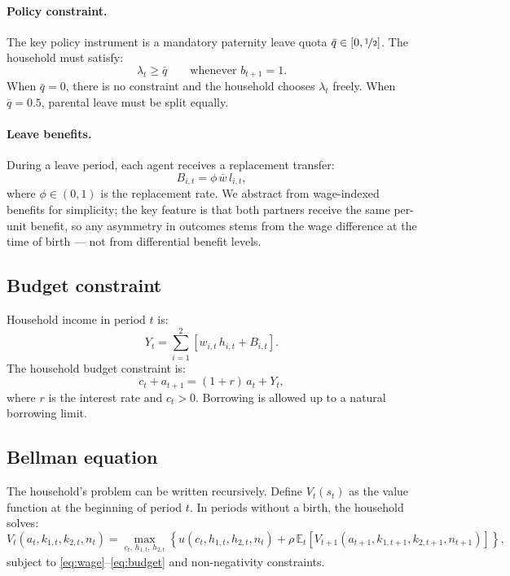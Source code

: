 \paragraph{Policy constraint.}
The key policy instrument is a mandatory paternity leave quota $\bar{q} \in [0, \nicefrac{1}{2}]$. The household must satisfy:
\begin{equation}
    \lambda_t \geq \bar{q} \qquad \text{whenever } b_{t+1} = 1.
    \label{eq:quota}
\end{equation}
When $\bar{q} = 0$, there is no constraint and the household chooses $\lambda_t$ freely. When $\bar{q} = 0.5$, parental leave must be split equally.

\paragraph{Leave benefits.}
During a leave period, each agent receives a replacement transfer:
\begin{equation}
    B_{i,t} = \phi\,\bar{w}\,l_{i,t},
    \label{eq:benefit}
\end{equation}
where $\phi \in (0,1)$ is the replacement rate. We abstract from wage-indexed benefits for simplicity; the key feature is that both partners receive the same per-unit benefit, so any asymmetry in outcomes stems from the wage difference at the time of birth --- not from differential benefit levels.

\subsection{Budget constraint}

Household income in period $t$ is:
\[
    Y_t = \sum_{i=1}^{2}\left[w_{i,t}\,h_{i,t} + B_{i,t}\right].
\]
The household budget constraint is:
\begin{equation}
    c_t + a_{t+1} = (1 + r)\,a_t + Y_t,
    \label{eq:budget}
\end{equation}
where $r$ is the interest rate and $c_t > 0$. Borrowing is allowed up to a natural borrowing limit.

\subsection{Bellman equation}

The household's problem can be written recursively. Define $V_t(s_t)$ as the value function at the beginning of period $t$. In periods without a birth, the household solves:
\begin{equation}
    V_t(a_t, k_{1,t}, k_{2,t}, n_t) = \max_{c_t,\, h_{1,t},\, h_{2,t}} \left\{ u(c_t, h_{1,t}, h_{2,t}, n_t) + \rho\,\mathbb{E}_t\!\left[V_{t+1}(a_{t+1}, k_{1,t+1}, k_{2,t+1}, n_{t+1})\right]\right\},
    \label{eq:bellman_nob}
\end{equation}
subject to \eqref{eq:wage}--\eqref{eq:budget} and non-negativity constraints.

